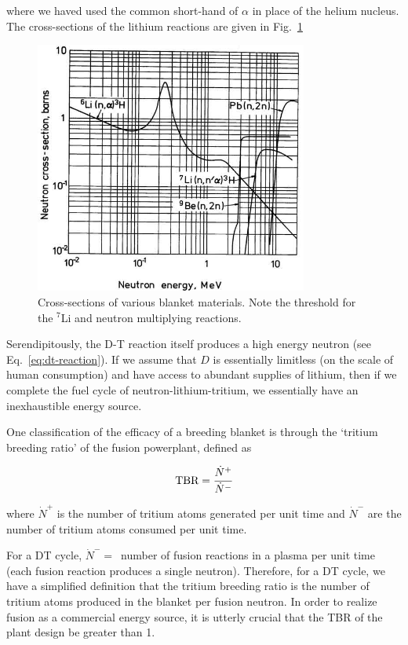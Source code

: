 where we haved used the common short-hand of $\alpha$ in place of the helium nucleus. The cross-sections of the lithium reactions are given in Fig.~\ref{fig:li-xsects}

\begin{figure}
	\centering
	\includegraphics[width=0.8\textwidth]{chapters/figures/breeding_xsecs} 
	\caption{Cross-sections of various blanket materials. Note the threshold for the $^7$Li and neutron multiplying reactions.}
	\label{fig:li-xsects}
\end{figure}

Serendipitously, the D-T reaction itself produces a high energy neutron (see Eq.~\ref{eq:dt-reaction}). If we assume that $D$ is essentially limitless (on the scale of human consumption) and have access to abundant supplies of lithium, then if we complete the fuel cycle of neutron-lithium-tritium, we essentially have an inexhaustible energy source.

One classification of the efficacy of a breeding blanket is through the `tritium breeding ratio' of the fusion powerplant, defined as 

\begin{equation}
	\text{TBR} = \cfrac{\dot{N}^+}{\dot{N}^-}
\end{equation}

where $\dot{N}^+$ is the number of tritium atoms generated per unit time and $\dot{N}^-$ are the number of tritium atoms consumed per unit time.

For a DT cycle, $\dot{N}^- = $~number of fusion reactions in a plasma per unit time (each fusion reaction produces a single neutron). Therefore, for a DT cycle, we have a simplified definition that the tritium breeding ratio is the number of tritium atoms produced in the blanket per fusion neutron. In order to realize fusion as a commercial energy source, it is utterly crucial that the TBR of the plant design be greater than 1.

